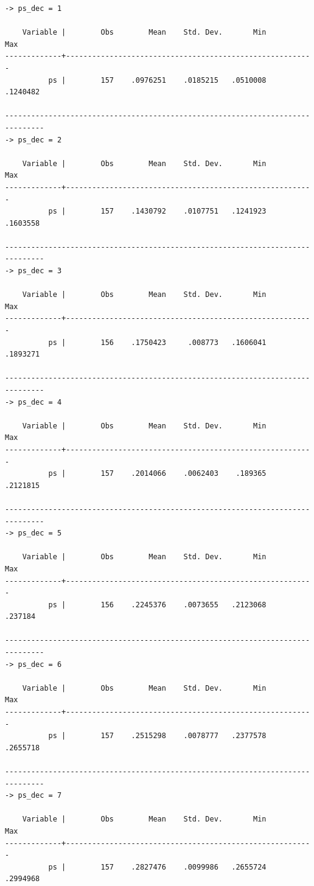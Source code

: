 \documentclass[
  10pt,
]{book}
\begin{document}
\begin{verbatim}
-> ps_dec = 1

    Variable |        Obs        Mean    Std. Dev.       Min        Max
-------------+---------------------------------------------------------
          ps |        157    .0976251    .0185215   .0510008   .1240482

-------------------------------------------------------------------------------
-> ps_dec = 2

    Variable |        Obs        Mean    Std. Dev.       Min        Max
-------------+---------------------------------------------------------
          ps |        157    .1430792    .0107751   .1241923   .1603558

-------------------------------------------------------------------------------
-> ps_dec = 3

    Variable |        Obs        Mean    Std. Dev.       Min        Max
-------------+---------------------------------------------------------
          ps |        156    .1750423     .008773   .1606041   .1893271

-------------------------------------------------------------------------------
-> ps_dec = 4

    Variable |        Obs        Mean    Std. Dev.       Min        Max
-------------+---------------------------------------------------------
          ps |        157    .2014066    .0062403    .189365   .2121815

-------------------------------------------------------------------------------
-> ps_dec = 5

    Variable |        Obs        Mean    Std. Dev.       Min        Max
-------------+---------------------------------------------------------
          ps |        156    .2245376    .0073655   .2123068    .237184

-------------------------------------------------------------------------------
-> ps_dec = 6

    Variable |        Obs        Mean    Std. Dev.       Min        Max
-------------+---------------------------------------------------------
          ps |        157    .2515298    .0078777   .2377578   .2655718

-------------------------------------------------------------------------------
-> ps_dec = 7

    Variable |        Obs        Mean    Std. Dev.       Min        Max
-------------+---------------------------------------------------------
          ps |        157    .2827476    .0099986   .2655724   .2994968


\end{verbatim}
\end{document}
